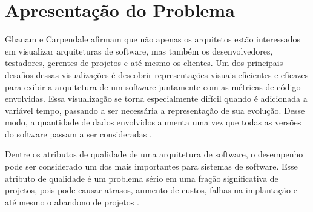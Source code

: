 
\section{Apresentação do Problema} \label{sec:apresentacao-do-problema}

Ghanam e Carpendale \cite{Ghanam2008} afirmam que não apenas os arquitetos estão interessados em visualizar arquiteturas de software, mas também os desenvolvedores, testadores, gerentes de projetos e até mesmo os clientes. Um dos principais desafios dessas visualizações é descobrir representações visuais eficientes e eficazes para exibir a arquitetura de um software juntamente com as métricas de código envolvidas. Essa visualização se torna especialmente difícil quando é adicionada a variável tempo, passando a ser necessária a representação de sua evolução. Desse modo, a quantidade de dados envolvidos aumenta uma vez que todas as versões do software passam a ser consideradas \cite{Caserta2011}\cite{Khan2012}.

Dentre os atributos de qualidade de uma arquitetura de software, o desempenho pode ser considerado um dos mais importantes para sistemas de software. Esse atributo de qualidade é um problema sério em uma fração significativa de projetos, pois pode causar atrasos, aumento de custos, falhas na implantação e até mesmo o abandono de projetos \cite{Woodside2007}.


